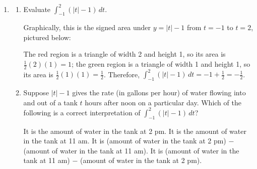 \documentclass[main]{subfiles}
\begin{document}
\begin{enumerate}[resume]
\item 
  \begin{enumerate}
  \item


    \begin{problem}[\vfill]
      Evaluate $\displaystyle \int_{-1}^2 (|t| - 1)\,dt$. 
    \end{problem}

    \begin{solution}
      Graphically, this is the signed area under $y = |t| - 1$ from $t =
      -1$ to $t = 2$, pictured below:
      \begin{center}
      \end{center}
      The red region is a triangle of width 2 and height 1, so its area is
      $\frac{1}{2}(2)(1) = 1$; the green region is a triangle of width 1
      and height 1, so its area is $\frac{1}{2} (1)(1) = \frac{1}{2}$.
      Therefore, $\displaystyle \int_{-1}^2 (|t| - 1)\,dt = -1 +
      \frac{1}{2} = \boxed{-\frac{1}{2}}$.
    \end{solution}

  \item Suppose $|t| - 1$ gives the rate (in gallons per hour) of water
    flowing into and out of a tank $t$ hours after noon on a particular
    day.  Which of the following is a correct interpretation of
    $\displaystyle \int_{-1}^2 (|t| - 1)\,dt$?
    \begin{enumerate}[label=\protect\maybecircle{\Alph*.},ref=\Alph*]
    \plainitem It is the amount of water in the tank at 2 pm.
    \plainitem It is the amount of water in the tank at 11 am.
    \circleitem It is (amount of water in the tank at 2 pm) $-$ (amount of
      water in the tank at 11 am).
    \plainitem It is (amount of water in the tank at 11 am) $-$ (amount of
      water in the tank at 2 pm).
    \end{enumerate}


\end{enumerate}
\end{enumerate}
\end{document}
